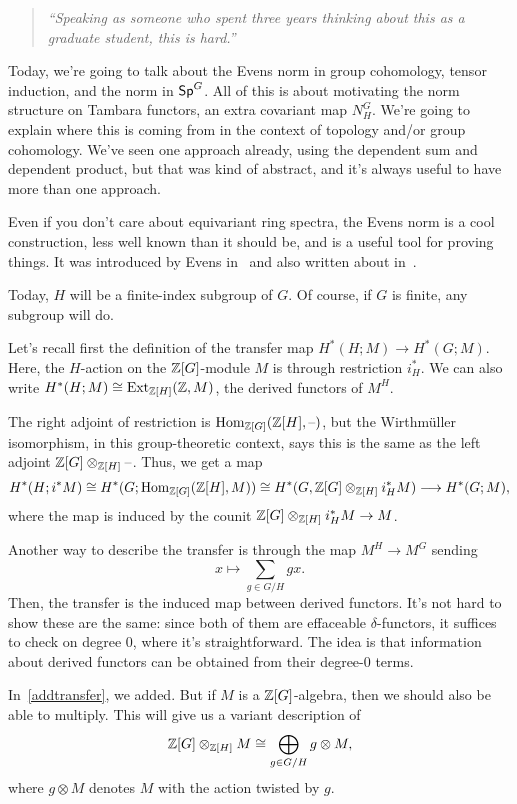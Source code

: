 \begin{quote}\textit{
	``Speaking as someone who spent three years thinking about this as a graduate student, this is hard.''
}\end{quote}
Today, we're going to talk about the Evens norm in group cohomology, tensor induction, and the norm in $\mathsf{Sp}^G$.
All of this is about motivating the norm structure on Tambara functors, an extra covariant map $N_H^G$. We're going
to explain where this is coming from in the context of topology and/or group cohomology. We've seen one approach
already, using the dependent sum and dependent product, but that was kind of abstract, and it's always useful to
have more than one approach.

Even if you don't care about equivariant ring spectra, the Evens norm is a cool construction, less well known than
it should be, and is a useful tool for proving things. It was introduced by Evens in~ and also written
about in~.

Today, $H$ will be a finite-index subgroup of $G$. Of course, if $G$ is finite, any subgroup will do.

Let's recall first the definition of the transfer map $H^*(H;M)\to H^*(G;M)$. Here, the $H$-action on the
$\mathbb Z[G]$-module $M$ is through restriction $i_H^*$. We can also write $H^*(H;M)\cong\operatorname{Ext}_{\mathbb Z[H]}(\mathbb Z, M)$, the
derived functors of $M^H$.

The right adjoint of restriction is $\operatorname{Hom}_{\mathbb Z[G]}(\mathbb Z[H], \text{--})$, but the Wirthmüller isomorphism, in this
group-theoretic context, says this is the same as the left adjoint $\mathbb Z[G]\otimes_{\mathbb Z[H]}\text{--}$. Thus, we get a map
\[H^*(H; i^*M)\cong H^*(G; \operatorname{Hom}_{\mathbb Z[G]}(\mathbb Z[H], M))\cong H^*(G, \mathbb Z[G]\otimes_{\mathbb Z[H]} i_H^*M)\longrightarrow
H^*(G;M),\]
where the map is induced by the counit $\mathbb Z[G]\otimes_{\mathbb Z[H]} i_H^*M\to M$.

Another way to describe the transfer is through the map $M^H\to M^G$ sending
\begin{equation}
\label{addtransfer}
x\mapsto \sum_{g\in G/H} gx.
\end{equation}
Then, the transfer is the induced map between derived functors. It's not hard to show these are the same: since
both of them are effaceable $\delta$-functors, it suffices to check on degree $0$, where it's straightforward. The
idea is that information about derived functors can be obtained from their degree-$0$ terms.

In~\eqref{addtransfer}, we added. But if $M$ is a $\mathbb Z[G]$-algebra, then we should also be able to multiply. This
will give us a variant description of
\[\mathbb Z[G]\otimes_{\mathbb Z[H]} M\cong \bigoplus_{g\in G/H} g\otimes M,\]
where $g\otimes M$ denotes $M$ with the action twisted by $g$.


